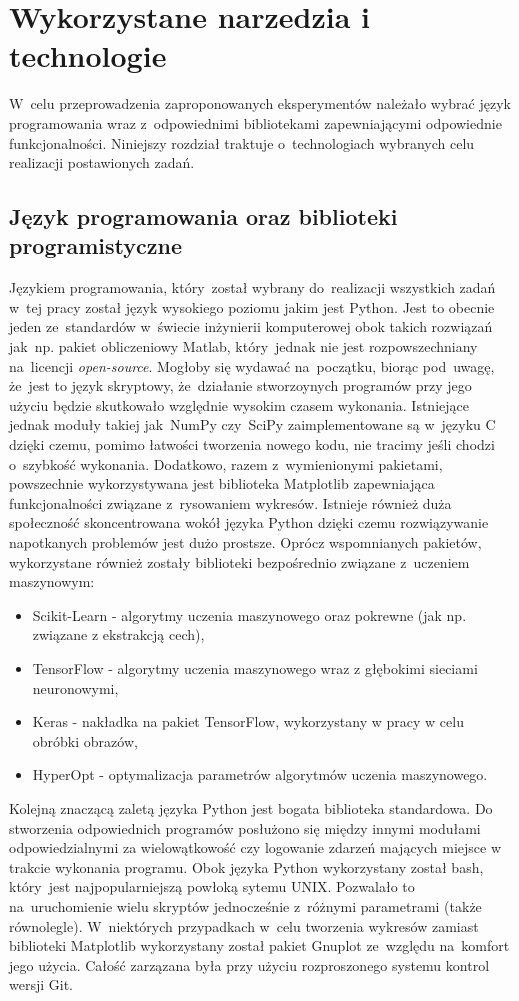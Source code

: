 \section{Wykorzystane narzedzia i technologie} \label{tools}
W~celu przeprowadzenia zaproponowanych eksperymentów należało wybrać język programowania wraz z~odpowiednimi bibliotekami zapewniającymi odpowiednie funkcjonalności. Niniejszy rozdział traktuje o~technologiach wybranych celu realizacji postawionych zadań.
\subsection{Język programowania oraz biblioteki programistyczne}
Językiem programowania, który~został wybrany do~realizacji wszystkich zadań w~tej pracy został język wysokiego poziomu jakim jest Python. Jest to obecnie jeden ze~standardów w~świecie inżynierii komputerowej obok takich rozwiązań jak~np. pakiet obliczeniowy Matlab, który~jednak nie jest rozpowszechniany na~licencji \textit{open-source}. Mogłoby się wydawać na~początku, biorąc pod~uwagę, że~jest to język skryptowy, że~działanie stworzoynych programów przy jego użyciu będzie skutkowało względnie wysokim czasem wykonania. Istniejące jednak moduły takiej jak~NumPy czy~SciPy\cite{scipy} zaimplementowane są w~języku C dzięki czemu, pomimo łatwości tworzenia nowego kodu, nie tracimy jeśli chodzi o~szybkość wykonania. Dodatkowo, razem z~wymienionymi pakietami, powszechnie wykorzystywana jest biblioteka Matplotlib\cite{matplotlib} zapewniająca funkcjonalności związane z~rysowaniem wykresów. Istnieje również duża społeczność skoncentrowana wokół języka Python dzięki czemu rozwiązywanie napotkanych problemów jest dużo prostsze. Oprócz wspomnianych pakietów, wykorzystane również zostały biblioteki bezpośrednio związane z~uczeniem maszynowym:
\begin{itemize}
\item Scikit-Learn\cite{scikit} - algorytmy uczenia maszynowego oraz pokrewne (jak np. związane z ekstrakcją cech),
\item TensorFlow\cite{tensorflow} - algorytmy uczenia maszynowego wraz z głębokimi sieciami neuronowymi,
\item Keras\cite{keras} - nakładka na pakiet TensorFlow, wykorzystany w pracy w celu obróbki obrazów,
\item HyperOpt\cite{hyperopt} - optymalizacja parametrów algorytmów uczenia maszynowego.
\end{itemize}
Kolejną znaczącą zaletą języka Python jest bogata biblioteka standardowa. Do stworzenia odpowiednich programów posłużono się między innymi modułami odpowiedzialnymi za wielowątkowość czy logowanie zdarzeń mających miejsce w trakcie wykonania programu. Obok języka Python wykorzystany został bash, który~jest najpopularniejszą powłoką sytemu UNIX. Pozwalało to na~uruchomienie wielu skryptów jednocześnie z~różnymi parametrami (także równolegle). W~niektórych przypadkach w~celu tworzenia wykresów zamiast biblioteki Matplotlib wykorzystany został pakiet Gnuplot ze~względu na~komfort jego użycia. Całość zarzązana była przy użyciu rozproszonego systemu kontrol wersji Git.

